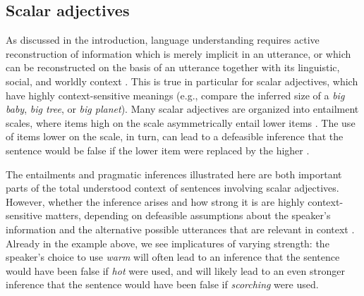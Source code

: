 \documentclass[10pt]{article}
\begin{document}
\subsection{\label{scalar-theory}Scalar adjectives}
\vspace{-.15mm}
As discussed in the introduction, language understanding requires active reconstruction of information which is merely implicit in an utterance, or which can be reconstructed on the basis of an utterance together with its linguistic, social, and worldly context \cite{grice1975logic,hobbs1993interpretation,clark1996using,hanna2003effects,piantadosi2012communicative}.
%
%
%
This is true in particular for scalar adjectives, which have highly context-sensitive meanings (e.g., compare the inferred size of a \emph{big baby}, \emph{big tree}, or \emph{big planet}). Many scalar adjectives are organized into entailment scales, where items high on the scale asymmetrically entail lower items \cite{horn89,horn2000pick}. The use of items lower on the scale, in turn, can lead to a defeasible inference that the sentence would be false if the lower item were replaced by the higher \cite{grice1975logic,horn89,lassiter10a}.
 \vspace{-.05in} 

 \vspace{-.05in}
The entailments and pragmatic inferences illustrated here are both important parts of the total understood context of sentences involving scalar adjectives. However, whether the inference arises and how strong it is are highly context-sensitive matters, depending on defeasible assumptions about the speaker's information and the alternative possible utterances that are relevant in context \cite{hirschberg1991theory,frank2012predicting,goodman2013knowledge}. Already in the example above, we see implicatures of varying strength: the speaker's choice to use \emph{warm} will often lead to an inference that the sentence would have been false if \emph{hot} were used, and will likely lead to an even stronger inference that the sentence would have been false if \emph{scorching} were used. 
\end{document}
